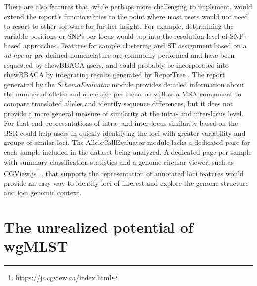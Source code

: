 There are also features that, while perhaps more challenging to implement, would extend the report's functionalities to the point where most users would not need to resort to other software for further insight. For example, determining the variable positions or \ac{SNPs} per locus would tap into the resolution level of \ac{SNP}-based approaches. Features for sample clustering and \ac{ST} assignment based on a \textit{ad hoc} or pre-defined nomenclature are commonly performed and have been requested by chewBBACA users, and could probably be incorporated into chewBBACA by integrating results generated by ReporTree \cite{mixao_reportree_2023}. The report generated by the \textit{SchemaEvaluator} module provides detailed information about the number of alleles and allele size per locus, as well as a \ac{MSA} component to compare translated alleles and identify sequence differences, but it does not provide a more general measure of similarity at the intra- and inter-locus level. For that end, representations of intra- and inter-locus similarity based on the BSR could help users in quickly identifying the loci with greater variability and groups of similar loci. The AlleleCallEvaluator module lacks a dedicated page for each sample included in the dataset being analyzed. A dedicated page per sample with summary classification statistics and a genome circular viewer, such as CGView.js\footnote{\url{https://js.cgview.ca/index.html}} \cite{stothard_visualizing_2019}, that supports the representation of annotated loci features would provide an easy way to identify loci of interest and explore the genome structure and loci genomic context.

\section{The unrealized potential of wgMLST}

